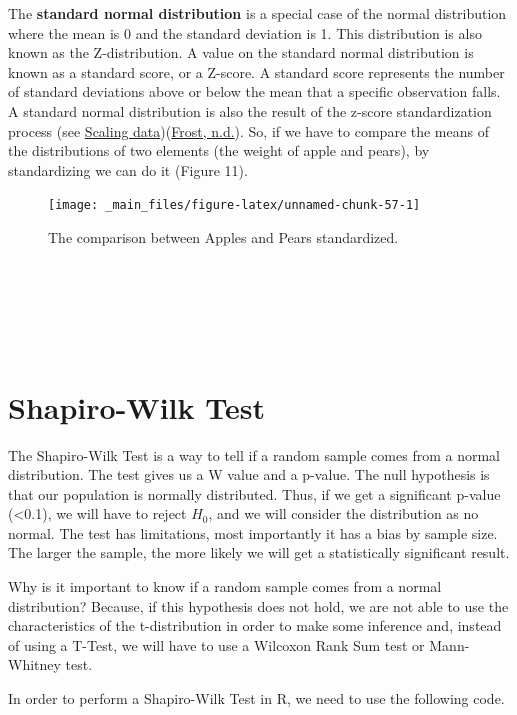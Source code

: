 \documentclass[
]{svmono}
\begin{document}
The \textbf{standard normal distribution} is a special case of the normal
distribution where the mean is 0 and the standard deviation is 1. This
distribution is also known as the Z-distribution. A value on the
standard normal distribution is known as a standard score, or a Z-score.
A standard score represents the number of standard deviations above or
below the mean that a specific observation falls. A standard normal
distribution is also the result of the z-score standardization process
(see \protect\hyperlink{scaling-data}{Scaling data})(\protect\hyperlink{ref-frost}{Frost, n.d.}). So, if we have to compare the means of the
distributions of two elements (the weight of apple and pears), by
standardizing we can do it (Figure 11).

\begin{figure}[H]

{\centering \texttt{[image: \_main\_files/figure-latex/unnamed-chunk-57-1]} 

}

\caption{The comparison between Apples and Pears standardized.}\label{fig:unnamed-chunk-57}
\end{figure}

~

~

~

\hypertarget{shapiro-wilk-test}{%
\section{Shapiro-Wilk Test}\label{shapiro-wilk-test}}

The Shapiro-Wilk Test is a way to tell if a random sample comes from a
normal distribution. The test gives us a W value and a p-value. The null
hypothesis is that our population is normally distributed. Thus, if we
get a significant p-value (\textless0.1), we will have to reject \(H_0\), and we
will consider the distribution as no normal. The test has limitations,
most importantly it has a bias by sample size. The larger the sample,
the more likely we will get a statistically significant result.

Why is it important to know if a random sample comes from a normal
distribution? Because, if this hypothesis does not hold, we are not able
to use the characteristics of the t-distribution in order to make some
inference and, instead of using a T-Test, we will have to use a Wilcoxon
Rank Sum test or Mann-Whitney test.

In order to perform a Shapiro-Wilk Test in R, we need to use the
following code.
\end{document}
